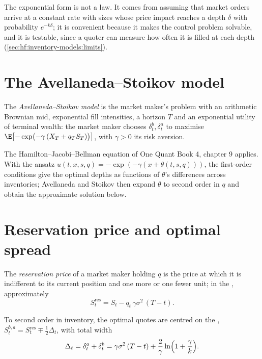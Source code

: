 The exponential form is not a law. It comes from assuming that market orders arrive at a constant rate with sizes whose price impact reaches a
depth $\delta$ with probability $e^{-k\delta}$; it is convenient because it makes the control problem solvable, and it is testable, since a quoter can
measure how often it is filled at each depth (\cref{sec:hf:inventory-models:limits}).

\section{The Avellaneda--Stoikov model}

\begin{definition}\label{def:hf:inventory-models:as}
The \emph{Avellaneda--Stoikov model} is the market maker's problem with an arithmetic Brownian mid, exponential fill
intensities, a horizon $T$ and an exponential utility of terminal wealth: the market maker chooses $\delta^b_t,\delta^a_t$ to maximise
$\E\bigl[-\exp\bigl(-\gamma\,(X_T+q_TS_T)\bigr)\bigr]$, with $\gamma>0$ its risk aversion.
\end{definition}

The Hamilton--Jacobi--Bellman equation of One Quant Book 4, chapter 9 applies. With the ansatz $u(t,x,s,q)=-\exp(-\gamma(x+\theta(t,s,q)))$, the
first-order conditions give the optimal depths as functions of $\theta$'s differences across inventories; Avellaneda and Stoikov then expand
$\theta$ to second order in $q$ and obtain the approximate solution below.

\section{Reservation price and optimal spread}

\begin{definition}\label{def:hf:inventory-models:reservation}
The \emph{reservation price} of a market maker holding $q$ is the price at which it is indifferent to its current position
and one more or one fewer unit; in the , approximately
\[
S^{\mathrm{res}}_t=S_t-q_t\,\gamma\sigma^2\,(T-t).
\]
\end{definition}

\begin{proposition}\label{prop:hf:inventory-models:as}
To second order in inventory, the optimal quotes are centred on the , $S^{b,a}_t=S^{\mathrm{res}}_t\mp\tfrac12\Delta_t$, with total
width
\[
\Delta_t=\delta^a_t+\delta^b_t=\gamma\sigma^2\,(T-t)+\frac{2}{\gamma}\ln\Bigl(1+\frac{\gamma}{k}\Bigr).
\]
\end{proposition}

